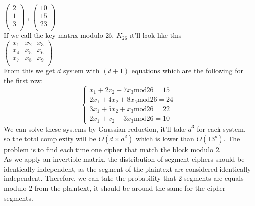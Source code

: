 \documentclass{article}
\begin{document}
	$\begin{pmatrix}
	2\\
	1\\
	3\\
 \end{pmatrix} $
, $\begin{pmatrix}
	10\\
	15\\
	23\\
	\end{pmatrix}$\\
If we call the key matrix modulo 26, $K_{26}$ it'll look like this:\\
$ \begin{pmatrix}
	x_1 & x_2 & x_3\\
	x_4 & x_5 & x_6\\
	x_7 & x_8 & x_9\\
	\end{pmatrix}$\\
From this we get $d$ system with $(d+1)$ equations which are the following for the first row:\\
\[ \begin{cases}
      x_1 +2x_2 + 7x_3 \text{mod} 26 =15\\
      2x_1 +4x_2 +8x_3 \text{mod} 26 = 24\\
			3x_1 + 5x_2 + x_3 \text{mod} 26 = 22\\
			2x_1 + x_2 +3x_3 \text{mod} 26 =10
   \end{cases}
\]
We can solve these systems by Gaussian reduction, it'll take $d^3$ for each system, so the total complexity will be $O(d \times d^{3})$ which is lower than $O(13^d)$.
The problem is to find each time one cipher that match the block modulo 2.\\
As we apply an invertible matrix, the distribution of segment ciphers should be identically independent, as the segment of the plaintext are considered identically independent. Therefore, we can take the probability that 2 segments are equals modulo 2 from the plaintext, it should be around the same for the cipher segments.


\appendix
\newpage
\end{document}
